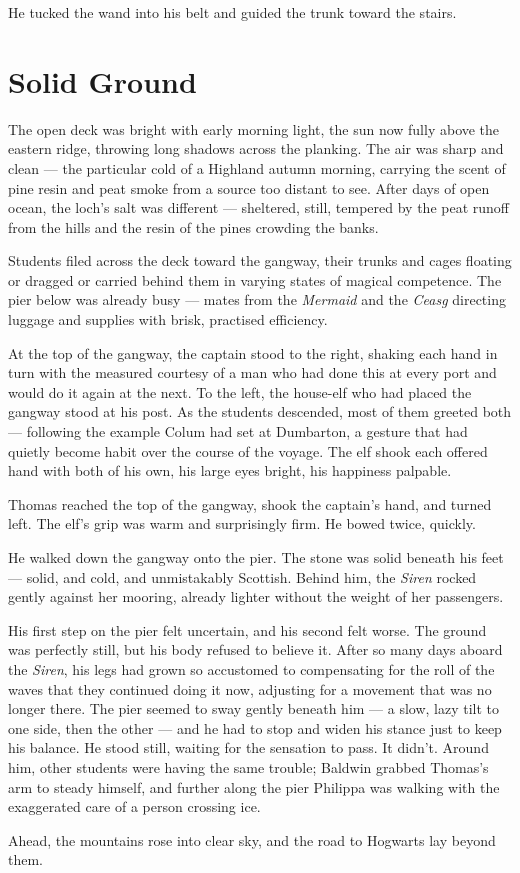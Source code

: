 He tucked the wand into his belt and guided the trunk toward the stairs.

\section*{Solid Ground}

The open deck was bright with early morning light, the sun now fully above the eastern ridge, throwing long shadows across the planking. The air was sharp and clean --- the particular cold of a Highland autumn morning, carrying the scent of pine resin and peat smoke from a source too distant to see. After days of open ocean, the loch's salt was different --- sheltered, still, tempered by the peat runoff from the hills and the resin of the pines crowding the banks.

Students filed across the deck toward the gangway, their trunks and cages floating or dragged or carried behind them in varying states of magical competence. The pier below was already busy --- mates from the \textit{Mermaid} and the \textit{Ceasg} directing luggage and supplies with brisk, practised efficiency.

At the top of the gangway, the captain stood to the right, shaking each hand in turn with the measured courtesy of a man who had done this at every port and would do it again at the next. To the left, the house-elf who had placed the gangway stood at his post. As the students descended, most of them greeted both --- following the example Colum had set at Dumbarton, a gesture that had quietly become habit over the course of the voyage. The elf shook each offered hand with both of his own, his large eyes bright, his happiness palpable.

Thomas reached the top of the gangway, shook the captain's hand, and turned left. The elf's grip was warm and surprisingly firm. He bowed twice, quickly.

He walked down the gangway onto the pier. The stone was solid beneath his feet --- solid, and cold, and unmistakably Scottish. Behind him, the \textit{Siren} rocked gently against her mooring, already lighter without the weight of her passengers.

His first step on the pier felt uncertain, and his second felt worse. The ground was perfectly still, but his body refused to believe it. After so many days aboard the \textit{Siren}, his legs had grown so accustomed to compensating for the roll of the waves that they continued doing it now, adjusting for a movement that was no longer there. The pier seemed to sway gently beneath him --- a slow, lazy tilt to one side, then the other --- and he had to stop and widen his stance just to keep his balance. He stood still, waiting for the sensation to pass. It didn't. Around him, other students were having the same trouble; Baldwin grabbed Thomas's arm to steady himself, and further along the pier Philippa was walking with the exaggerated care of a person crossing ice.

Ahead, the mountains rose into clear sky, and the road to Hogwarts lay beyond them.
